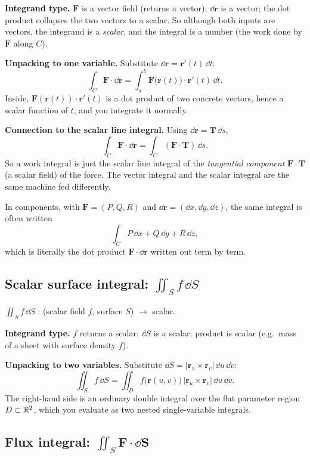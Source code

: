 \documentclass{essay}
\newcommand{\F}{\mathbf{F}}
\newcommand{\rr}{\mathbf{r}}
\newcommand{\TT}{\mathbf{T}}
\begin{document}
\textbf{Integrand type.} \(\F\) is a vector field (returns a vector); \(\dd\mathbf{r}\) is
a vector; the dot product collapses the two vectors to a scalar. So although both
inputs are vectors, the integrand is a \emph{scalar}, and the integral is a number
(the work done by \(\F\) along \(C\)).

\textbf{Unpacking to one variable.} Substitute \(\dd\mathbf{r}=\rr'(t)\,\dd t\):
\[ \int_{C} \F\cdot\dd\mathbf{r} = \int_{a}^{b} \F\bigl(\rr(t)\bigr)\cdot\rr'(t)\,\dd t . \]
Inside, \(\F(\rr(t))\cdot\rr'(t)\) is a dot product of two concrete vectors, hence a
scalar function of \(t\), and you integrate it normally.

\textbf{Connection to the scalar line integral.} Using \(\dd\mathbf{r}=\TT\,\dd s\),
\[ \int_{C} \F\cdot\dd\mathbf{r} = \int_{C} (\F\cdot\TT)\,\dd s . \]
So a work integral is just the scalar line integral of the \emph{tangential
component} \(\F\cdot\TT\) (a scalar field) of the force. The vector integral and the
scalar integral are the same machine fed differently.

In components, with \(\F=(P,Q,R)\) and \(\dd\mathbf{r}=(\dd x,\dd y,\dd z)\), the same
integral is often written
\[ \int_{C} P\,\dd x + Q\,\dd y + R\,\dd z, \]
which is literally the dot product \(\F\cdot\dd\mathbf{r}\) written out term by term.

\subsection{Scalar surface integral: \(\iint_{S} f\,\dd S\)}

\begin{signature}
  \(\displaystyle \iint_{S} f\,\dd S\) \;:\; (scalar field \(f\), surface \(S\)) \(\to\) scalar.
\end{signature}

\textbf{Integrand type.} \(f\) returns a scalar; \(\dd S\) is a scalar; product is
scalar (e.g.\ mass of a sheet with surface density \(f\)).

\textbf{Unpacking to two variables.} Substitute
\(\dd S = \lvert\rr_{u}\times\rr_{v}\rvert\,\dd u\,\dd v\):
\[ \iint_{S} f\,\dd S = \iint_{D} f\bigl(\rr(u,v)\bigr)\,\lvert\rr_{u}\times\rr_{v}\rvert\,\dd u\,\dd v . \]
The right-hand side is an ordinary double integral over the flat parameter region
\(D\subset\mathbb{R}^{2}\), which you evaluate as two nested single-variable integrals.

\subsection{Flux integral: \(\iint_{S} \F\cdot\dd\mathbf{S}\)}
\end{document}
